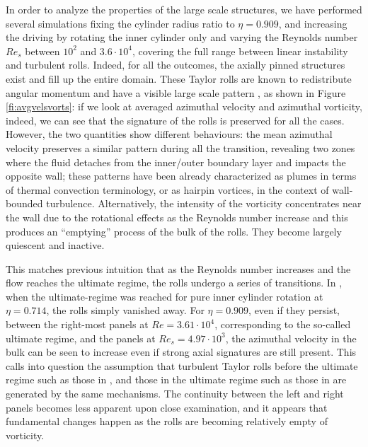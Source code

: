 \documentclass{jfm}
\begin{document}
In order to analyze the properties of the large scale structures, we have performed several simulations fixing the cylinder radius ratio to $\eta=0.909$, and increasing the driving by rotating the inner cylinder only and varying the Reynolds number $Re_s$ between $10^2$ and $3.6\cdot10^4$, covering the full range between linear instability and turbulent rolls. Indeed, for all the outcomes, the axially pinned structures exist and fill up the entire domain. These Taylor rolls are known to redistribute angular momentum and have a visible large scale pattern \citep{lat92,ost16}, as shown in Figure \ref{fi:avgvelsvorts}: if we look at averaged azimuthal velocity and azimuthal vorticity, indeed, we can see that the signature of the rolls is preserved for all the cases. However, the two quantities show different behaviours: the mean azimuthal velocity preserves a similar pattern during all the transition, revealing two zones where the fluid detaches from the inner/outer boundary layer and impacts the opposite wall; these patterns have been already characterized as plumes in terms of thermal convection terminology, or as hairpin vortices, in the context of wall-bounded turbulence.  Alternatively, the intensity of the vorticity concentrates near the wall due to the rotational effects as the Reynolds number increase and this produces an ``emptying'' process of the bulk of the rolls. They become largely quiescent and inactive. 

This matches previous intuition that as the Reynolds number increases and the flow reaches the ultimate regime, the rolls undergo a series of transitions. In \cite{ost14b}, when the ultimate-regime was reached for pure inner cylinder rotation at $\eta=0.714$, the rolls simply vanished away. For $\eta=0.909$, even if they persist, between the right-most panels at $Re=3.61\cdot 10^4$, corresponding to the so-called ultimate regime, and the panels at $Re_s=4.97\cdot 10^3$, the azimuthal velocity in the bulk can be seen to increase even if strong axial signatures are still present. This calls into question the assumption that turbulent Taylor rolls before the ultimate regime such as those in \cite{and86}, and those in the ultimate regime such as those in \cite{hui14} are generated by the same mechanisms. The continuity between the left and right panels becomes less apparent upon close examination, and it appears that fundamental changes happen as the rolls are becoming relatively empty of vorticity. 
\end{document}
